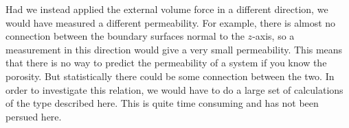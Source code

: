 \documentclass[12pt]{article}
\begin{document}
Had we instead applied the external volume force in a different direction, we would have measured a different permeability. For example, there is almost no connection between the boundary surfaces normal to the
$z$-axis, so a measurement in this direction would give a very small permeability. This means that there is no way to predict the permeability of a system if you know the porosity. But statistically there could
be some connection between the two. In order to investigate this relation, we would have to do a large set of calculations of the type described here. This is quite time consuming and has not been persued here.

\end{document}
